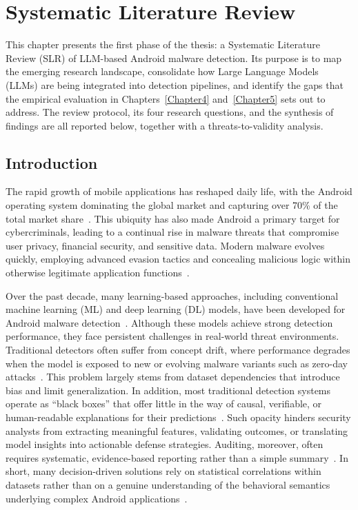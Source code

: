 \chapter{Systematic Literature Review}
\label{Chapter3}

This chapter presents the first phase of the thesis: a Systematic Literature
Review (SLR) of LLM-based Android malware detection. Its purpose is to map the
emerging research landscape, consolidate how Large Language Models (LLMs) are
being integrated into detection pipelines, and identify the gaps that the
empirical evaluation in Chapters~\ref{Chapter4} and~\ref{Chapter5} sets out to
address. The review protocol, its four research questions, and the synthesis of
findings are all reported below, together with a threats-to-validity analysis.

\section{Introduction}

The rapid growth of mobile applications has reshaped daily life, with the Android operating system dominating the global market and capturing over 70\% of the total market share~\cite{odea2025android,counterpoint2025smartphones}. This ubiquity has also made Android a primary target for cybercriminals, leading to a continual rise in malware threats that compromise user privacy, financial security, and sensitive data. Modern malware evolves quickly, employing advanced evasion tactics and concealing malicious logic within otherwise legitimate application functions~\cite{mccart2025androidmalware}.

Over the past decade, many learning-based approaches, including conventional machine learning (ML) and deep learning (DL) models, have been developed for Android malware detection~\cite{xu2019droidevolver,kim2019multimodal,cai2021jowmdroid,liu2024unraveling}. Although these models achieve strong detection performance, they face persistent challenges in real-world threat environments. Traditional detectors often suffer from concept drift, where performance degrades when the model is exposed to new or evolving malware variants such as zero-day attacks~\cite{barbero2022transcending}. This problem largely stems from dataset dependencies that introduce bias and limit generalization. In addition, most traditional detection systems operate as ``black boxes'' that offer little in the way of causal, verifiable, or human-readable explanations for their predictions~\cite{pendlebury2019tesseract,Li2024-wl}. Such opacity hinders security analysts from extracting meaningful features, validating outcomes, or translating model insights into actionable defense strategies. Auditing, moreover, often requires systematic, evidence-based reporting rather than a simple summary~\cite{chen2017automated}. In short, many decision-driven solutions rely on statistical correlations within datasets rather than on a genuine understanding of the behavioral semantics underlying complex Android applications~\cite{Li2024-wl}.

